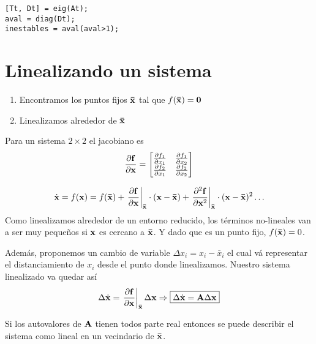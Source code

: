 \begin{lstlisting}
[Tt, Dt] = eig(At);
aval = diag(Dt);
inestables = aval(aval>1);
\end{lstlisting}

\section{Linealizando un sistema}

\begin{enumerate}
	\item Encontramos los puntos fijos $\mathbf{\bar{x}}$ tal que \(f(\mathbf{\bar{x}})=\mathbf{0}\)
	\item Linealizamos alrededor de $\mathbf{\bar{x}}$
\end{enumerate}

Para un sistema \(2\times 2\) el jacobiano es
\[
\frac{\partial {\mathbf{f}}}{\partial {\mathbf{x}}}=
\begin{bmatrix}
\frac{\partial {f_1}}{\partial {x_1}} &\frac{\partial {f_1}}{\partial {x_2}} \\
\frac{\partial {f_2}}{\partial {x_1}} & \frac{\partial {f_2}}{\partial {x_2}}
\end{bmatrix}
\]


\[
\dot{\mathbf{x}} = f(\mathbf{x}) = f(\mathbf{\bar{x}}) + \left. \frac{\partial {\mathbf{f}}}{\partial {\mathbf{x}}}\right|_{\mathbf{\bar{x}}}\cdot (\mathbf{x}-\mathbf{\bar{x}}) + \left.\frac{\partial^2 \mathbf{f}}{\partial \mathbf{x} ^2} \right|_{\mathbf{\bar{x}}}\cdot (\mathbf{x}-\mathbf{\bar{x}})^2 \ldots
\]
Como linealizamos alrededor de un entorno reducido, los términos no-lineales van a ser muy pequeños si $\mathbf{x}$ es cercano a $\mathbf{\bar{x}}$. Y dado que es un punto fijo, $f(\mathbf{\bar{x}})=0$.

Además, proponemos un cambio de variable $\Delta x_i =  x_i - \bar{x}_i$ el cual vá representar el distanciamiento de $x_i$ desde el punto donde linealizamos. Nuestro sistema linealizado va quedar así
\[
\Delta \dot{\mathbf{x}} = \left.\frac{\partial {\mathbf{f}}}{\partial {\mathbf{x}}}\right|_{\mathbf{\bar{x}}} \Delta \mathbf{x} \Rightarrow \boxed{\Delta \dot{\mathbf{x}} = \mathbf{A} \Delta \mathbf{x} }
\]

\begin{theorem}
Si los autovalores de $\mathbf{A}$ tienen todos parte real entonces se puede describir el sistema como lineal en un vecindario de $\mathbf{\bar{x}}$.
\end{theorem}


